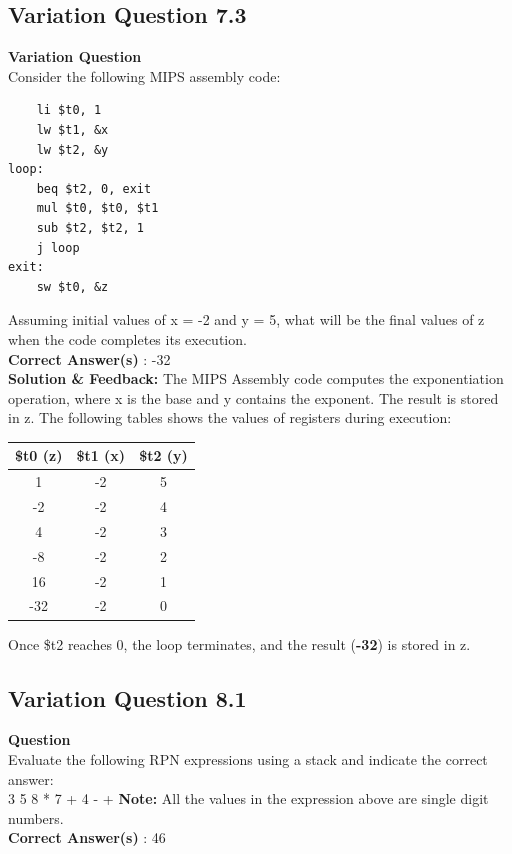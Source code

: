 \subsection{Variation Question 7.3}
\textbf{Variation Question} \\
Consider the following MIPS assembly code: \\
\begin{lstlisting}
    li $t0, 1
    lw $t1, &x
    lw $t2, &y
loop:
    beq $t2, 0, exit
    mul $t0, $t0, $t1
    sub $t2, $t2, 1
    j loop
exit:
    sw $t0, &z
\end{lstlisting}
Assuming initial values of x = -2 and y = 5, what will be the final values of z when the code completes its execution.\\


\textbf{Correct Answer(s)} : -32  \\

\noindent \textbf{Solution \& Feedback:}
\noindent The MIPS Assembly code computes the exponentiation operation, where x is the base and y contains the exponent. The result is stored in z.
\noindent The following tables shows the values of registers during execution:

\begin{tabular}{|c|c|c|}
\hline
\textbf{\$t0 (z)} & \textbf{\$t1 (x)} & \textbf{\$t2 (y)} \\
\hline
1 & -2 & 5 \\
\hline
-2 & -2 & 4 \\
\hline
4 & -2 & 3 \\
\hline
-8 & -2 & 2 \\
\hline
16 & -2 & 1 \\
\hline
-32 & -2 & 0 \\
\hline
\end{tabular}

\noindent Once \$t2 reaches 0, the loop terminates, and the result (\textbf{-32}) is stored in z.

\subsection{Variation Question 8.1}
\textbf{Question} \\
Evaluate the following RPN expressions using a stack and indicate the correct answer:\\
3 5 8 * 7 + 4 - +
\textbf{Note:} All the values in the expression above are single digit numbers.\\

\textbf{Correct Answer(s)} : 46 

